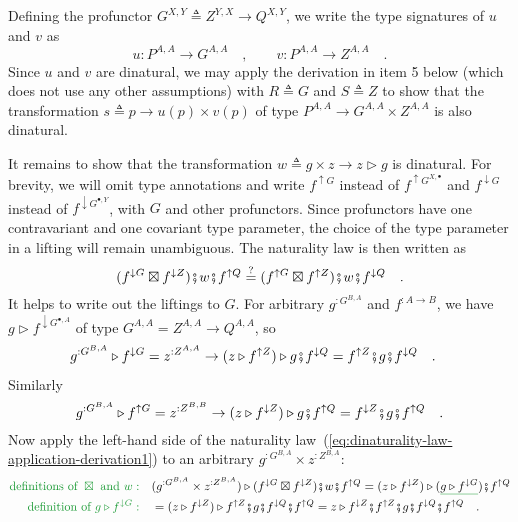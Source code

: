 Defining the profunctor $G^{X,Y}\triangleq Z^{Y,X}\rightarrow Q^{X,Y}$,
we write the type signatures of $u$ and $v$ as 
\[
u:P^{A,A}\rightarrow G^{A,A}\quad,\quad\quad v:P^{A,A}\rightarrow Z^{A,A}\quad.
\]
Since $u$ and $v$ are dinatural, we may apply the derivation in
item 5 below (which does not use any other assumptions) with $R\triangleq G$
and $S\triangleq Z$ to show that the transformation $s\triangleq p\rightarrow u(p)\times v(p)$
of type $P^{A,A}\rightarrow G^{A,A}\times Z^{A,A}$ is also dinatural.

It remains to show that the transformation $w\triangleq g\times z\rightarrow z\triangleright g$
is dinatural. For brevity, we will omit type annotations and write
$f^{\uparrow G}$ instead of $f^{\uparrow G^{X,\bullet}}$ and $f^{\downarrow G}$
instead of $f^{\downarrow G^{\bullet,Y}}$, with $G$ and other profunctors.
Since profunctors have one contravariant and one covariant type parameter,
the choice of the type parameter in a lifting will remain unambiguous.
The naturality law is then written as
\begin{equation}
(f^{\downarrow G}\boxtimes f^{\downarrow Z})\bef w\bef f^{\uparrow Q}\overset{?}{=}(f^{\uparrow G}\boxtimes f^{\uparrow Z})\bef w\bef f^{\downarrow Q}\quad.\label{eq:dinaturality-law-application-derivation1}
\end{equation}
It helps to write out the liftings to $G$. For arbitrary $g^{:G^{B,A}}$
and $f^{:A\rightarrow B}$, we have $g\triangleright f^{\downarrow G^{\bullet,A}}$
of type $G^{A,A}=Z^{A,A}\rightarrow Q^{A,A}$, so
\begin{align*}
g^{:G^{B,A}}\triangleright f^{\downarrow G} & =z^{:Z^{A,A}}\rightarrow(z\triangleright f^{\uparrow Z})\triangleright g\bef f^{\downarrow Q}=f^{\uparrow Z}\bef g\bef f^{\downarrow Q}\quad.
\end{align*}
Similarly
\[
g^{:G^{B,A}}\triangleright f^{\uparrow G}=z^{:Z^{B,B}}\rightarrow(z\triangleright f^{\downarrow Z})\triangleright g\bef f^{\uparrow Q}=f^{\downarrow Z}\bef g\bef f^{\uparrow Q}\quad.
\]
Now apply the left-hand side of the naturality law~(\ref{eq:dinaturality-law-application-derivation1})
to an arbitrary $g^{:G^{B,A}}\times z^{:Z^{B,A}}$:
\begin{align*}
{\color{greenunder}\text{definitions of }\boxtimes\text{ and }w:}\quad & (g^{:G^{B,A}}\times z^{:Z^{B,A}})\triangleright(f^{\downarrow G}\boxtimes f^{\downarrow Z})\bef w\bef f^{\uparrow Q}=(z\triangleright f^{\downarrow Z})\triangleright(\gunderline{g\triangleright f^{\downarrow G}})\bef f^{\uparrow Q}\\
{\color{greenunder}\text{definition of }g\triangleright f^{\downarrow G}:}\quad & =(z\triangleright f^{\downarrow Z})\triangleright f^{\uparrow Z}\bef g\bef f^{\downarrow Q}\bef f^{\uparrow Q}=z\triangleright f^{\downarrow Z}\bef f^{\uparrow Z}\bef g\bef f^{\downarrow Q}\bef f^{\uparrow Q}\quad.
\end{align*}
